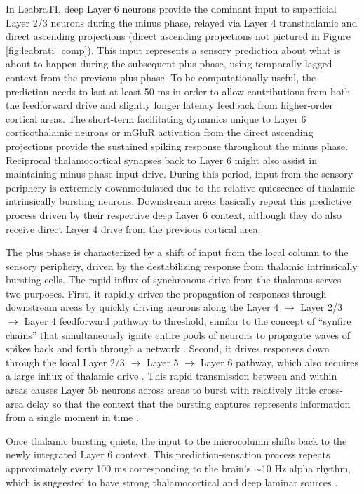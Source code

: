 \documentclass[dwyatte_dissertation.tex]{subfiles}
\begin{document}
In LeabraTI, deep Layer 6 neurons provide the dominant input to superficial Layer 2/3 neurons during the minus phase, relayed via Layer 4 transthalamic and direct ascending projections (direct ascending projections not pictured in Figure \ref{fig:leabrati_comp}). This input represents a sensory prediction about what is about to happen during the subsequent plus phase, using temporally lagged context from the previous plus phase. To be computationally useful, the prediction needs to last at least 50 ms in order to allow contributions from both the feedforward drive and slightly longer latency feedback from higher-order cortical areas. The short-term facilitating dynamics unique to Layer 6 corticothalamic neurons or mGluR activation from the direct ascending projections provide the sustained spiking response throughout the minus phase. Reciprocal thalamocortical synapses back to Layer 6 might also assist in maintaining minus phase input drive. During this period, input from the sensory periphery is extremely downmodulated due to the relative quiescence of thalamic intrinsically bursting neurons. Downstream areas basically repeat this predictive process driven by their respective deep Layer 6 context, although they do also receive direct Layer 4 drive from the previous cortical area. 

The plus phase is characterized by a shift of input from the local column to the sensory periphery, driven by the destabilizing response from thalamic intrinsically bursting cells. The rapid influx of synchronous drive from the thalamus serves two purposes. First, it rapidly drives the propagation of responses through downstream areas by quickly driving neurons along the Layer 4 $\rightarrow$ Layer 2/3 $\rightarrow$ Layer 4 feedforward pathway \cite{FellemanVanEssen91} to threshold, similar to the concept of ``synfire chains'' that simultaneously ignite entire pools of neurons to propagate waves of spikes back and forth through a network \cite{BrunoSakmann06,WangSpencerFellousEtAl10,TiesingaFellousSejnowski08}. Second, it drives responses down through the local Layer 2/3 $\rightarrow$ Layer 5 $\rightarrow$ Layer 6 pathway, which also requires a large influx of thalamic drive \cite{BeierleinFallRinzelEtAl02}. This rapid transmission between and within areas causes Layer 5b neurons across areas to burst with relatively little cross-area delay so that the context that the bursting captures represents information from a single moment in time \cite{BollimuntaChenSchroederEtAl08}.

Once thalamic bursting quiets, the input to the microcolumn shifts back to the newly integrated Layer 6 context. This prediction-sensation process repeats approximately every 100 ms corresponding to the brain's $\sim$10 Hz alpha rhythm, which is suggested to have strong thalamocortical and deep laminar sources \cite{LopesdaSilva91,KlimeschSausengHanslmayr07,PalvaPalva07,LorinczKekesiJuhaszEtAl09,BollimuntaMoSchroederEtAl11,HanslmayrGrossKlimeschEtAl11}. 
\end{document}
